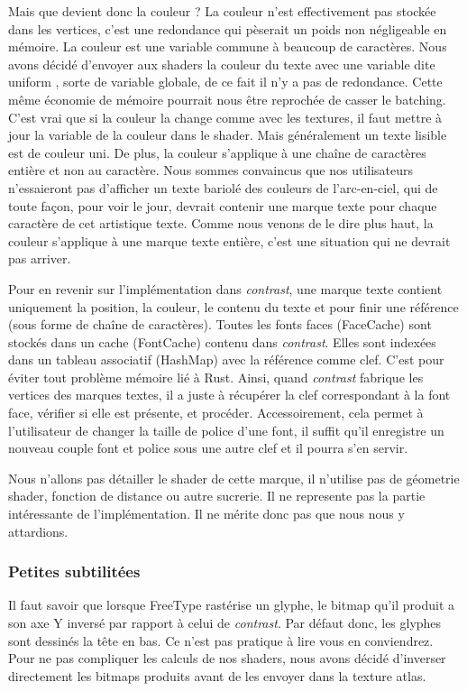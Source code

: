 \documentclass[12pt]{article}
\begin{document}
Mais que devient donc la couleur ? La couleur n'est effectivement pas stockée dans les vertices, c'est une redondance qui pèserait un poids non négligeable en mémoire. La couleur est une variable
commune à beaucoup de caractères. Nous avons décidé d'envoyer aux shaders la couleur du texte avec une variable dite \og uniform \fg{}, sorte de variable globale, de ce fait il n'y a pas de redondance.
Cette même économie de mémoire pourrait nous être reprochée de casser le batching. C'est vrai que si la couleur la change comme avec les textures, il faut mettre à jour la variable de la couleur
dans le shader. Mais généralement un texte lisible est de couleur uni. De plus, la couleur s'applique à une chaîne de caractères entière et non au caractère. Nous sommes convaincus que nos utilisateurs
n'essaieront pas d'afficher un texte bariolé des couleurs de l'arc-en-ciel, qui de toute façon, pour voir le jour, devrait contenir une marque texte pour chaque caractère de cet artistique texte.
Comme nous venons de le dire plus haut, la couleur s'applique à une marque texte entière, c'est une situation qui ne devrait pas arriver.

Pour en revenir sur l'implémentation dans \textit{contrast}, une marque texte contient uniquement la position, la couleur, le contenu du texte et pour finir une référence (sous forme
de chaîne de caractères). Toutes les fonts faces (FaceCache) sont stockés dans un cache (FontCache) contenu dans \textit{contrast}. Elles sont indexées dans un tableau associatif (HashMap) avec la référence
comme clef. C'est pour éviter tout problème mémoire lié à Rust. Ainsi, quand \textit{contrast} fabrique les vertices des marques textes, il a juste à récupérer la clef correspondant à la font face,
vérifier si elle est présente, et procéder. Accessoirement, cela permet à l'utilisateur de changer la taille de police d'une font, il suffit qu'il enregistre un nouveau couple font et police
sous une autre clef et il pourra s'en servir.

Nous n'allons pas détailler le shader de cette marque, il n'utilise pas de géometrie shader, fonction de distance ou autre sucrerie.
Il ne represente pas la partie intéressante de l'implémentation. Il ne mérite donc pas que nous nous y attardions.

\subsubsection{Petites subtilitées}

Il faut savoir que lorsque FreeType rastérise un glyphe, le bitmap qu'il produit a son axe Y inversé par rapport à celui de \textit{contrast}. Par défaut donc, les glyphes sont dessinés la tête en bas.
Ce n'est pas pratique à lire vous en conviendrez. Pour ne pas compliquer les calculs de nos shaders, nous avons décidé d'inverser directement les bitmaps produits avant de les envoyer
dans la texture atlas.
\end{document}
